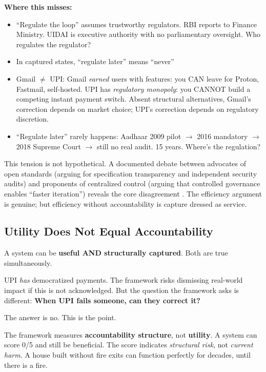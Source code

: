 \documentclass{article}
\begin{document}
\textbf{Where this misses:}
\begin{itemize}
    \item ``Regulate the loop'' assumes trustworthy regulators. RBI reports to Finance Ministry. UIDAI is executive authority with no parliamentary oversight. Who regulates the regulator?
    \item In captured states, ``regulate later'' means ``never''
    \item Gmail $\neq$ UPI: Gmail \textit{earned} users with features: you CAN leave for Proton, Fastmail, self-hosted. UPI has \textit{regulatory monopoly}: you CANNOT build a competing instant payment switch. Absent structural alternatives, Gmail's correction depends on market choice; UPI's correction depends on regulatory discretion.
    \item ``Regulate later'' rarely happens: Aadhaar 2009 pilot $\rightarrow$ 2016 mandatory $\rightarrow$ 2018 Supreme Court $\rightarrow$ still no real audit. 15 years. Where's the regulation?
\end{itemize}

This tension is not hypothetical. A documented debate between advocates of open standards (arguing for specification transparency and independent security audits) and proponents of centralized control (arguing that controlled governance enables ``faster iteration'') reveals the core disagreement \citep{abraham2020}. The efficiency argument is genuine; but efficiency without accountability is capture dressed as service.

\subsection{Utility Does Not Equal Accountability}
\label{subsec:utility}

A system can be \textbf{useful AND structurally captured}. Both are true simultaneously.

UPI \textit{has} democratized payments. The framework risks dismissing real-world impact if this is not acknowledged. But the question the framework asks is different: \textbf{When UPI fails someone, can they correct it?}

The answer is no. This is the point.

The framework measures \textbf{accountability structure}, not \textbf{utility}. A system can score 0/5 and still be beneficial. The score indicates \textit{structural risk}, not \textit{current harm}. A house built without fire exits can function perfectly for decades, until there is a fire.
\end{document}

